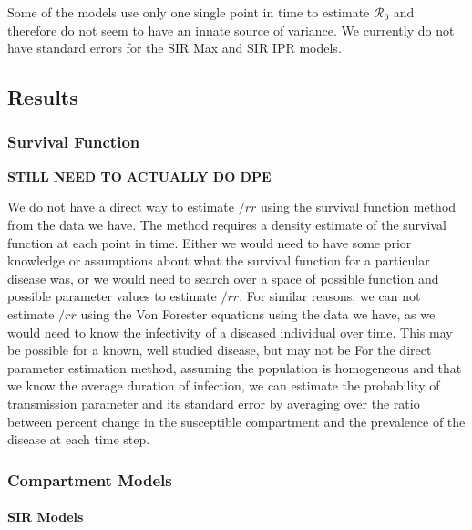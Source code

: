 \documentclass[12pt]{article}
\newcommand{\rr}{\ensuremath{\mathcal{R}_0}}
\begin{document}
Some of the models use only one single point in time to estimate $\rr$ and therefore do not seem to have an innate source of variance. We currently do not have standard errors for the SIR Max and SIR IPR models.

\subsection{Results}

\subsubsection{Survival Function}

\textbf{STILL NEED TO ACTUALLY DO DPE}

We do not have a direct way to estimate $/rr$ using the survival function method from the data we have. The method requires a density estimate of the survival function at each point in time. Either we would need to have some prior knowledge or assumptions about what the survival function for a particular disease was, or we would need to search over a space of possible function and possible parameter values to estimate $/rr$. For similar reasons, we can not estimate $/rr$ using the Von Forester equations using the data we have, as we would need to know the infectivity of a diseased individual over time. This may be possible for a known, well studied disease, but may not be  For the direct parameter estimation method, assuming the population is homogeneous and that we know the average duration of infection, we can estimate the probability of transmission parameter and its standard error by averaging over the ratio between percent change in the susceptible compartment and the prevalence of the disease at each time step.



\subsubsection{Compartment Models}

\paragraph{SIR Models}
\end{document}
